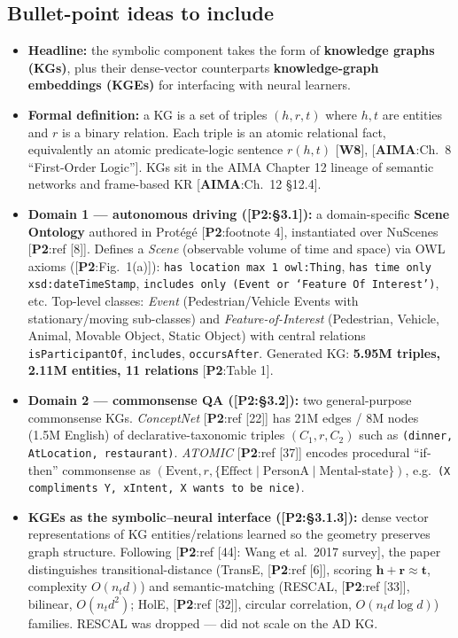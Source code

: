 \documentclass[11pt, a4paper]{article}
\newcommand{\paperref}[1]{\textcolor{srcBd}{\small[\textbf{P2}:#1]}}
\newcommand{\aimaref}[1]{\textcolor{srcBd}{\small[\textbf{AIMA}:#1]}}
\newcommand{\courseref}[1]{\textcolor{srcBd}{\small[\textbf{W#1}]}}
\begin{document}
\subsection{Bullet-point ideas to include}

\begin{itemize}
  \item \textbf{Headline:} the symbolic component takes the form of \textbf{knowledge graphs (KGs)}, plus their dense-vector counterparts \textbf{knowledge-graph embeddings (KGEs)} for interfacing with neural learners.
  \item \textbf{Formal definition:} a KG is a set of triples \((h, r, t)\) where \(h, t\) are entities and \(r\) is a binary relation. Each triple is an atomic relational fact, equivalently an atomic predicate-logic sentence \(r(h, t)\) \courseref{8}, \aimaref{Ch.\ 8 ``First-Order Logic''}. KGs sit in the AIMA Chapter 12 lineage of semantic networks and frame-based KR \aimaref{Ch.\ 12 §12.4}.
  \item \textbf{Domain 1 — autonomous driving (\paperref{§3.1}):} a domain-specific \textbf{Scene Ontology} authored in Protégé \paperref{footnote 4}, instantiated over NuScenes \paperref{ref [8]}. Defines a \emph{Scene} (observable volume of time and space) via OWL axioms (\paperref{Fig.\ 1(a)}): \texttt{has location max 1 owl:Thing}, \texttt{has time only xsd:dateTimeStamp}, \texttt{includes only (Event or `Feature Of Interest')}, etc. Top-level classes: \emph{Event} (Pedestrian/Vehicle Events with stationary/moving sub-classes) and \emph{Feature-of-Interest} (Pedestrian, Vehicle, Animal, Movable Object, Static Object) with central relations \texttt{isParticipantOf}, \texttt{includes}, \texttt{occursAfter}. Generated KG: \textbf{5.95M triples, 2.11M entities, 11 relations} \paperref{Table 1}.
  \item \textbf{Domain 2 — commonsense QA (\paperref{§3.2}):} two general-purpose commonsense KGs. \emph{ConceptNet} \paperref{ref [22]} has 21M edges / 8M nodes (1.5M English) of declarative-taxonomic triples \((C_1, r, C_2)\) such as \texttt{(dinner, AtLocation, restaurant)}. \emph{ATOMIC} \paperref{ref [37]} encodes procedural ``if-then'' commonsense as \((\mathrm{Event}, r, \{\mathrm{Effect} \mid \mathrm{PersonA} \mid \mathrm{Mental\text{-}state}\})\), e.g.\ \texttt{(X compliments Y, xIntent, X wants to be nice)}.
  \item \textbf{KGEs as the symbolic--neural interface (\paperref{§3.1.3}):} dense vector representations of KG entities/relations learned so the geometry preserves graph structure. Following \paperref{ref [44]: Wang et al.\ 2017 survey}, the paper distinguishes transitional-distance (TransE, \paperref{ref [6]}, scoring \(\mathbf{h} + \mathbf{r} \approx \mathbf{t}\), complexity \(O(n_t d)\)) and semantic-matching (RESCAL, \paperref{ref [33]}, bilinear, \(O(n_t d^2)\); HolE, \paperref{ref [32]}, circular correlation, \(O(n_t d \log d)\)) families. RESCAL was dropped — did not scale on the AD KG.

\end{itemize}
\end{document}
